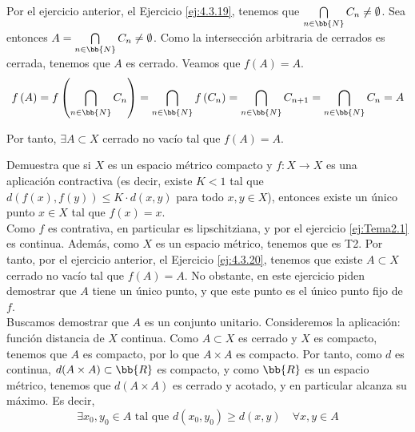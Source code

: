 \begin{ejercicio}
    Por el ejercicio anterior, el Ejercicio \ref{ej:4.3.19}, tenemos que $\bigcap\limits_{n\in \bb{N}} C_n \neq \emptyset$. Sea entonces $A=\bigcap\limits_{n\in \bb{N}} C_n\neq \emptyset$.
    Como la intersección arbitraria de cerrados es cerrada, tenemos que $A$ es cerrado. Veamos que $f(A)=A$.
    \begin{equation*}
        f\left(A\right)
        = f\left(\bigcap_{n\in \bb{N}} C_n\right)
        = \bigcap_{n\in \bb{N}} f\left(C_n\right)
        = \bigcap_{n\in \bb{N}} C_{n+1}
        = \bigcap_{n\in \bb{N}} C_n
        = A
    \end{equation*}

    Por tanto, $\exists A\subset X$ cerrado no vacío tal que $f(A)=A$.
\end{ejercicio}

\begin{ejercicio}
    Demuestra que si $X$ es un espacio métrico compacto y $f: X \to X$ es una aplicación contractiva (es decir, existe $K < 1$ tal que $d(f(x), f(y)) \leq K \cdot d(x, y)$ para todo $x, y \in X$),
    entonces existe un único punto $x \in X$ tal que $f(x) = x$.\\

    Como $f$ es contrativa, en particular es lipschitziana, y por el ejercicio \ref{ej:Tema2.1} es continua. Además, como $X$ es un espacio métrico, tenemos que es T2.
    Por tanto, por el ejercicio anterior, el Ejercicio \ref{ej:4.3.20}, tenemos que existe $A\subset X$ cerrado no vacío tal que $f(A)=A$.
    No obstante, en este ejercicio piden demostrar que $A$ tiene un único punto, y que este punto es el único punto fijo de $f$.\\

    Buscamos demostrar que $A$ es un conjunto unitario. Consideremos la aplicación:
    función distancia de $X$ continua.
    Como $A\subset X$ es cerrado y $X$ es compacto, tenemos que $A$ es compacto, por lo que $A\times A$ es compacto. Por tanto, como $d$ es continua,
    $d(A\times A)\subset \bb{R}$ es compacto, y como $\bb{R}$ es un espacio métrico, tenemos que $d(A\times A)$ es cerrado y acotado,
    y en particular alcanza su máximo. Es decir,
    \begin{equation*}
        \exists x_0,y_0\in A \text{ tal que } d(x_0,y_0)\geq d(x,y)\quad \forall x,y\in A
    \end{equation*}


\end{ejercicio}
